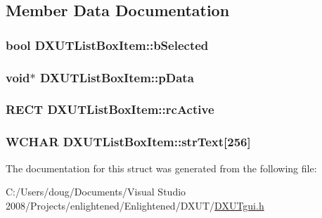 \subsection{Member Data Documentation}
\hypertarget{struct_d_x_u_t_list_box_item_afe3354ef18fa6419ed65eef48005c34e}{
\subsubsection[{bSelected}]{\setlength{\rightskip}{0pt plus 5cm}bool {\bf DXUTListBoxItem::bSelected}}}
\label{struct_d_x_u_t_list_box_item_afe3354ef18fa6419ed65eef48005c34e}
\hypertarget{struct_d_x_u_t_list_box_item_ab5321ce735e7a9f9adb77f90cea3c9bc}{
\subsubsection[{pData}]{\setlength{\rightskip}{0pt plus 5cm}void$\ast$ {\bf DXUTListBoxItem::pData}}}
\label{struct_d_x_u_t_list_box_item_ab5321ce735e7a9f9adb77f90cea3c9bc}
\hypertarget{struct_d_x_u_t_list_box_item_ab469e8349577c965969b6055c46b5385}{
\subsubsection[{rcActive}]{\setlength{\rightskip}{0pt plus 5cm}RECT {\bf DXUTListBoxItem::rcActive}}}
\label{struct_d_x_u_t_list_box_item_ab469e8349577c965969b6055c46b5385}
\hypertarget{struct_d_x_u_t_list_box_item_afae48ae64202ceb407e7e61292187003}{
\subsubsection[{strText}]{\setlength{\rightskip}{0pt plus 5cm}WCHAR {\bf DXUTListBoxItem::strText}\mbox{[}256\mbox{]}}}
\label{struct_d_x_u_t_list_box_item_afae48ae64202ceb407e7e61292187003}


The documentation for this struct was generated from the following file:\begin{DoxyCompactItemize}
\item 
C:/Users/doug/Documents/Visual Studio 2008/Projects/enlightened/Enlightened/DXUT/\hyperlink{_d_x_u_tgui_8h}{DXUTgui.h}\end{DoxyCompactItemize}
